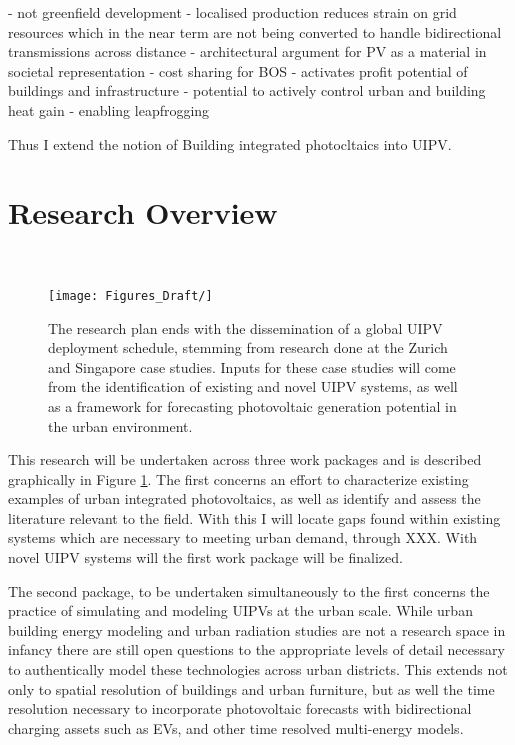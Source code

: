- not greenfield development
- localised production reduces strain on grid resources which in the near term are not being converted to handle bidirectional transmissions across distance
- architectural argument for PV as a material in societal representation
- cost sharing for BOS 
- activates profit potential of buildings and infrastructure
- potential to actively control urban and building heat gain
- enabling leapfrogging

Thus I extend the notion of Building integrated photocltaics into UIPV.


\section{Research Overview}\

\begin{figure}[b]
    \centering
    \texttt{[image: Figures\_Draft/]}
    \caption{The research plan ends with the dissemination of a global UIPV deployment schedule, stemming from research done at the Zurich and Singapore case studies. Inputs for these case studies will come from the identification of existing and novel UIPV systems, as well as a framework for forecasting photovoltaic generation potential in the urban environment.}
    \label{fig:researchoverview}
\end{figure}

This research will be undertaken across three work packages and is described graphically in Figure \ref{fig:researchoverview}. The first concerns an effort to characterize existing examples of urban integrated photovoltaics, as well as identify and assess the literature relevant to the field. With this I will locate gaps found within existing systems which are necessary to meeting urban demand, through XXX. With novel UIPV systems will the first work package will be finalized. 

The second package, to be undertaken simultaneously to the first concerns the practice of simulating and modeling UIPVs at the urban scale. While urban building energy modeling and urban radiation studies are not a research space in infancy there are still open questions to the appropriate levels of detail necessary to authentically model these technologies across urban districts. This extends not only to spatial resolution of buildings and urban furniture, but as well the time resolution necessary to incorporate photovoltaic forecasts with bidirectional charging assets such as EVs, and other time resolved multi-energy models.

